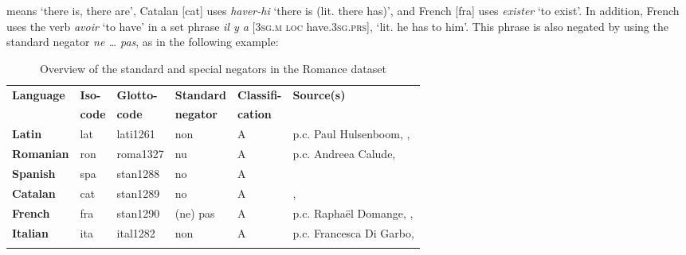 ﻿\documentclass[output=paper]{langsci/langscibook}
\begin{document}
means `there is, there are', Catalan [cat] uses
\textit{haver-hi} `there is (lit. there has)', and French [fra]
uses \textit{exister} `to exist'. In addition, French uses the verb
\textit{avoir} `to have' in a set phrase \textit{il y a} [\textsc{3sg.m loc}
    have.\textsc{3sg.prs}], `lit. he has to him'. This phrase is also negated by using
the standard negator \textit{ne … pas}, as  in the following
example:
%
    \begin{exe}\end{exe}

\begin{table}\begin{small}
\caption{Overview of the standard and special negators in the Romance dataset}\label{tab:ieur-class-Romance}
\begin{tabularx}{\textwidth}{@{} l l l l l Q @{}}
\lsptoprule
\textbf{Language} & \textbf{Iso-} & \textbf{Glotto-} & \textbf{Standard} &
\textbf{Classifi-} & \textbf{Source(s)}\\
& \textbf{code} & \textbf{code} & \textbf{negator} & \textbf{cation} \\
\midrule
\textbf{Latin} & lat & lati1261 & non & A & p.c. Paul
Hulsenboom, \citet{GreenoughKittredge1903}, \textcite{Roby1862} \\
\midrule
\textbf{Romanian} & ron & roma1327 & nu & A & p.c. Andreea Calude, \citet{Gonczol2008} \\
\midrule
\textbf{Spanish} & spa & stan1288 & no & A & \citet{ButtBenjamin1994} \\
\midrule
\textbf{Catalan} & cat & stan1289 & no & A & \citet{Hualde1992},
\citet{WheelerYates1999} \\
\midrule
\textbf{French} & fra & stan1290 & (ne) pas & A & p.c. Raphaël Domange, \citet{LangPerez2004}, \citet{Offord2006} \\
\midrule
\textbf{Italian} & ita & ital1282 & non & A & p.c. Francesca Di Garbo, \citet{PeyronelHiggins2006} \\
\lspbottomrule
\end{tabularx}
\end{small}\end{table}
\end{document}
